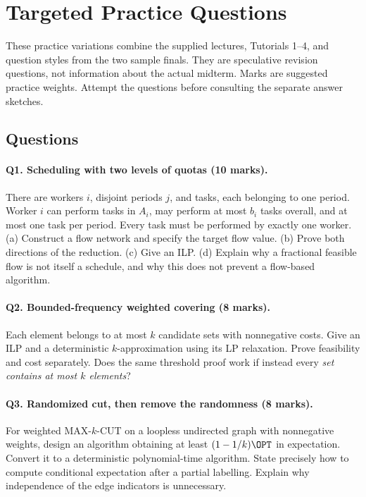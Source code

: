 \section{Targeted Practice Questions}\label{prac:questions}\label{prac:main}
These practice variations combine the supplied lectures, Tutorials 1--4,
and question styles from the two sample finals.  They are speculative
revision questions, not information about the actual midterm.  Marks are
suggested practice weights.  Attempt the questions before consulting the
separate answer sketches.

\subsection{Questions}
\paragraph{Q1. Scheduling with two levels of quotas (10 marks).}
There are workers $i$, disjoint periods $j$, and tasks, each belonging to
one period.  Worker $i$ can perform tasks in $A_i$, may perform at most
$b_i$ tasks overall, and at most one task per period.  Every task must be
performed by exactly one worker.
(a) Construct a flow network and specify the target flow value.
(b) Prove both directions of the reduction.  (c) Give an ILP.
(d) Explain why a fractional feasible flow is not itself a schedule, and
why this does not prevent a flow-based algorithm.

\paragraph{Q2. Bounded-frequency weighted covering (8 marks).}
Each element belongs to at most $k$ candidate sets with nonnegative costs.
Give an ILP and a deterministic $k$-approximation using its LP relaxation.
Prove feasibility and cost separately.  Does the same threshold proof work
if instead every \emph{set contains at most $k$ elements}?

\paragraph{Q3. Randomized cut, then remove the randomness (8 marks).}
For weighted MAX-$k$-CUT on a loopless undirected graph with nonnegative
weights, design an algorithm obtaining at least $(1-1/k)\OPT$ in expectation.
Convert it to a deterministic polynomial-time algorithm.  State precisely
how to compute conditional expectation after a partial labelling.  Explain
why independence of the edge indicators is unnecessary.

